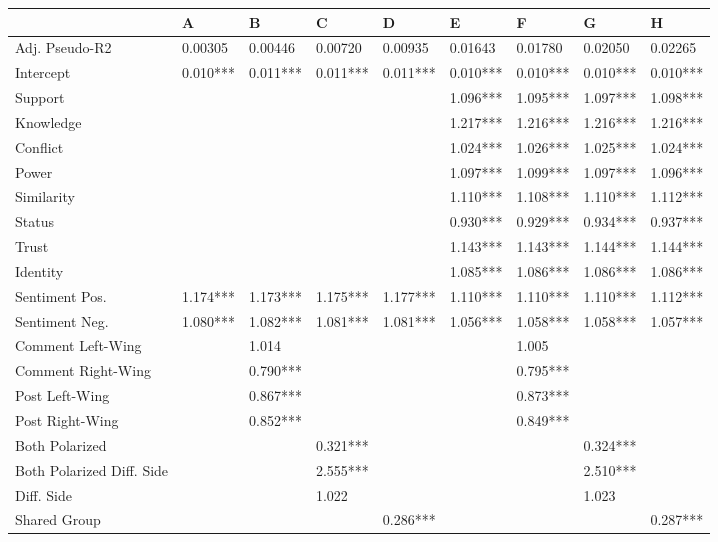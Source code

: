 \begin{tabular}{lllllllll}
\toprule
 & A & B & C & D & E & F & G & H \\
\midrule
Adj. Pseudo-R2 & 0.00305 & 0.00446 & 0.00720 & 0.00935 & 0.01643 & 0.01780 & 0.02050 & 0.02265 \\
Intercept & 0.010*** & 0.011*** & 0.011*** & 0.011*** & 0.010*** & 0.010*** & 0.010*** & 0.010*** \\
Support &  &  &  &  & 1.096*** & 1.095*** & 1.097*** & 1.098*** \\
Knowledge &  &  &  &  & 1.217*** & 1.216*** & 1.216*** & 1.216*** \\
Conflict &  &  &  &  & 1.024*** & 1.026*** & 1.025*** & 1.024*** \\
Power &  &  &  &  & 1.097*** & 1.099*** & 1.097*** & 1.096*** \\
Similarity &  &  &  &  & 1.110*** & 1.108*** & 1.110*** & 1.112*** \\
Status &  &  &  &  & 0.930*** & 0.929*** & 0.934*** & 0.937*** \\
Trust &  &  &  &  & 1.143*** & 1.143*** & 1.144*** & 1.144*** \\
Identity &  &  &  &  & 1.085*** & 1.086*** & 1.086*** & 1.086*** \\
Sentiment Pos. & 1.174*** & 1.173*** & 1.175*** & 1.177*** & 1.110*** & 1.110*** & 1.110*** & 1.112*** \\
Sentiment Neg. & 1.080*** & 1.082*** & 1.081*** & 1.081*** & 1.056*** & 1.058*** & 1.058*** & 1.057*** \\
Comment Left-Wing &  & 1.014 &  &  &  & 1.005 &  &  \\
Comment Right-Wing &  & 0.790*** &  &  &  & 0.795*** &  &  \\
Post Left-Wing &  & 0.867*** &  &  &  & 0.873*** &  &  \\
Post Right-Wing &  & 0.852*** &  &  &  & 0.849*** &  &  \\
Both Polarized &  &  & 0.321*** &  &  &  & 0.324*** &  \\
Both Polarized Diff. Side &  &  & 2.555*** &  &  &  & 2.510*** &  \\
Diff. Side &  &  & 1.022 &  &  &  & 1.023 &  \\
Shared Group &  &  &  & 0.286*** &  &  &  & 0.287*** \\
\bottomrule
\end{tabular}
